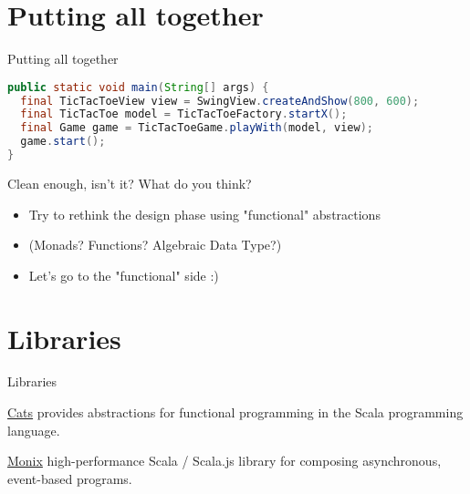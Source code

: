 \documentclass[presentation]{beamer}
\let\oldcite\cite
\renewcommand{\cite}[1]{{\color{blue}\oldcite{#1}}}
\begin{document}
\section{Putting all together}
\begin{frame}[fragile]{Putting all together}

\begin{lstlisting}[language=Java]
public static void main(String[] args) {
  final TicTacToeView view = SwingView.createAndShow(800, 600);
  final TicTacToe model = TicTacToeFactory.startX();
  final Game game = TicTacToeGame.playWith(model, view);
  game.start();
}
\end{lstlisting}
\begin{block}{Clean enough, isn't it?}
  What do you think?
  \begin{itemize}
    \item Try to rethink the design phase using "functional" abstractions
    \item (Monads? Functions? Algebraic Data Type?)
    \item Let's go to the "functional" side :)
  \end{itemize}
\end{block}
\end{frame}

\section{Libraries}
\begin{frame}[fragile]{Libraries}

\begin{block}{\href{https://typelevel.org/cats/}{Cats} \cite{scalacats2017}}
  provides abstractions for functional programming in the Scala programming language.
\end{block}

\begin{block}{\href{https://monix.io/}{Monix}}
  high-performance Scala / Scala.js library for composing asynchronous, event-based programs.
\end{block}

\end{frame}
\end{document}

